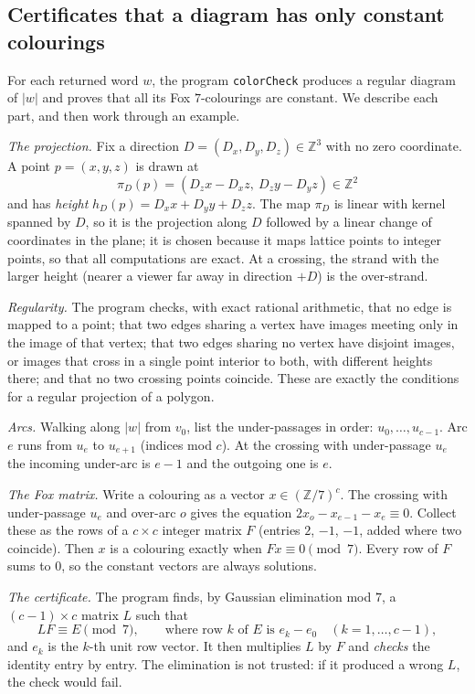 \documentclass[11pt]{article}
\theoremstyle{plain}
\theoremstyle{definition}
\theoremstyle{remark}
\newcommand{\Z}{\mathbb{Z}}
\newcommand{\lean}[1]{\texttt{#1}}
\begin{document}
\subsection{Certificates that a diagram has only constant colourings}\label{sec:certificates}

For each returned word $w$, the program \lean{colorCheck} produces a regular diagram of $|w|$ and proves
that all its Fox $7$-colourings are constant. We describe each part, and then work through an example.

\emph{The projection.} Fix a direction $D=(D_x,D_y,D_z)\in\Z^3$ with no zero coordinate. A point
$p=(x,y,z)$ is drawn at
\[ \pi_D(p)=(D_zx-D_xz,\ D_zy-D_yz)\in\Z^2 \]
and has \emph{height} $h_D(p)=D_xx+D_yy+D_zz$. The map $\pi_D$ is linear with kernel spanned by $D$, so
it is the projection along $D$ followed by a linear change of coordinates in the plane; it is chosen
because it maps lattice points to integer points, so that all computations are exact. At a crossing,
the strand with the larger height (nearer a viewer far away in direction $+D$) is the over-strand.

\emph{Regularity.} The program checks, with exact rational arithmetic, that no edge is mapped to a
point; that two edges sharing a vertex have images meeting only in the image of that vertex; that two
edges sharing no vertex have disjoint images, or images that cross in a single point interior to both,
with different heights there; and that no two crossing points coincide. These are exactly the
conditions for a regular projection of a polygon.

\emph{Arcs.} Walking along $|w|$ from $v_0$, list the under-passages in order: $u_0,\dots,u_{c-1}$. Arc
$e$ runs from $u_e$ to $u_{e+1}$ (indices mod $c$). At the crossing with under-passage $u_e$ the
incoming under-arc is $e-1$ and the outgoing one is $e$.

\emph{The Fox matrix.} Write a colouring as a vector $x\in(\Z/7)^c$. The crossing with under-passage
$u_e$ and over-arc $o$ gives the equation $2x_o-x_{e-1}-x_e\equiv0$. Collect these as the rows of a
$c\times c$ integer matrix $F$ (entries $2$, $-1$, $-1$, added where two coincide). Then $x$ is a
colouring exactly when $Fx\equiv0\pmod7$. Every row of $F$ sums to $0$, so the constant vectors are
always solutions.

\emph{The certificate.} The program finds, by Gaussian elimination mod $7$, a $(c-1)\times c$ matrix
$L$ such that
\[ LF\equiv E\pmod 7,\qquad\text{where row $k$ of $E$ is } e_k-e_0\quad(k=1,\dots,c-1), \]
and $e_k$ is the $k$-th unit row vector. It then multiplies $L$ by $F$ and \emph{checks} the identity
entry by entry. The elimination is not trusted: if it produced a wrong $L$, the check would fail.
\end{document}
